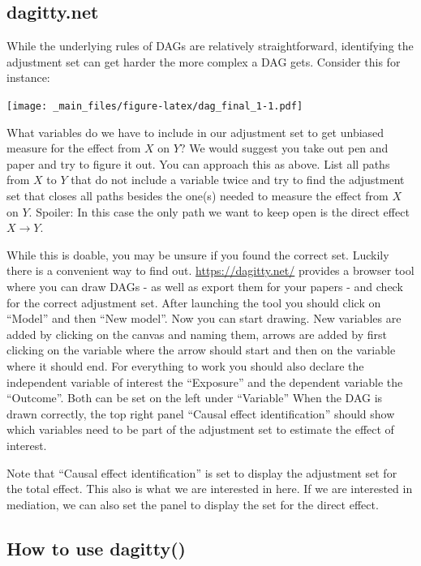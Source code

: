 \documentclass[
]{book}
\begin{document}
\hypertarget{dagitty.net}{%
\subsection{dagitty.net}\label{dagitty.net}}

While the underlying rules of DAGs are relatively straightforward, identifying
the adjustment set can get harder the more complex a DAG gets. Consider this for
instance:

\texttt{[image: \_main\_files/figure-latex/dag\_final\_1-1.pdf]}

What variables do we have to include in our adjustment set to get unbiased
measure for the effect from \(X\) on \(Y\)? We would suggest you take out pen and paper
and try to figure it out. You can approach this as above. List all paths from
\(X\) to \(Y\) that do not include a variable twice and try to find the adjustment
set that closes all paths besides the one(s) needed to measure the effect from
\(X\) on \(Y\). Spoiler: In this case the only path we want to keep open is the
direct effect \(X \rightarrow Y\).

While this is doable, you may be unsure if you found the correct set. Luckily there
is a convenient way to find out. \url{https://dagitty.net/} provides a browser tool
where you can draw DAGs - as well as export them for your papers - and check for
the correct adjustment set. After launching the tool you should click on ``Model''
and then ``New model''. Now you can start drawing. New variables are added by
clicking on the canvas and naming them, arrows are added by first clicking on
the variable where the arrow should start and then on the variable where it
should end. For everything to work you should also declare the independent
variable of interest the ``Exposure'' and the dependent variable the ``Outcome''.
Both can be set on the left under ``Variable'' When the DAG is drawn correctly,
the top right panel ``Causal effect identification'' should show which variables
need to be part of the adjustment set to estimate the effect of interest.

Note that ``Causal effect identification'' is set to display the adjustment set
for the total effect. This also is what we are interested in here. If we are
interested in mediation, we can also set the panel to display the set for the
direct effect.

\hypertarget{how-to-use-dagitty}{%
\subsection{How to use dagitty()}\label{how-to-use-dagitty}}
\end{document}

